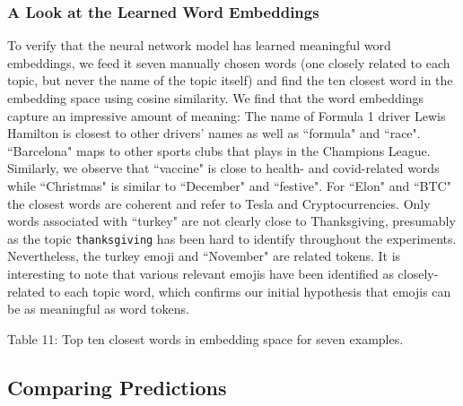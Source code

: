 \documentclass[11pt]{article}
\begin{document}
\subsubsection{A Look at the Learned Word Embeddings}
To verify that the neural network model has learned meaningful word embeddings, we feed it seven manually chosen words (one closely related to each topic, but never the name of the topic itself) and find the ten closest word in the embedding space using cosine similarity. We find that the word embeddings capture an impressive amount of meaning: The name of Formula 1 driver Lewis Hamilton is closest to other drivers' names as well as ``formula" and ``race". ``Barcelona" maps to other sports clubs that plays in the Champions League. Similarly,  we observe that ``vaccine" is close to health- and covid-related words while ``Christmas" is similar to ``December" and ``festive". For ``Elon" and ``BTC" the closest words are coherent and refer to Tesla and Cryptocurrencies. Only words associated with ``turkey" are not clearly close to Thanksgiving, presumably as the topic \texttt{thanksgiving} has been hard to identify throughout the experiments. Nevertheless, the turkey emoji and ``November" are related tokens. It is interesting to note that various relevant emojis have been identified as closely-related to each topic word, which confirms our initial hypothesis that emojis can be as meaningful as word tokens.
\\

\begin{adjustbox}{width=\columnwidth,center}

\end{adjustbox}
\begin{center}
	Table 11: Top ten closest words in embedding space for seven examples.
\end{center}

\subsection{Comparing Predictions}



\end{document}
